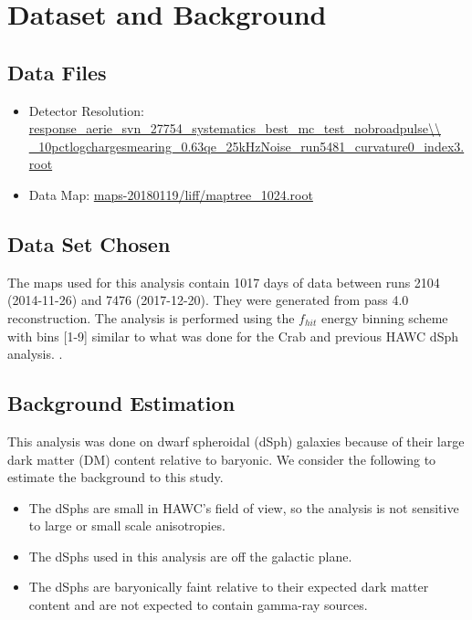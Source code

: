 

\section{Dataset and Background \label{sec:gd_databgd}}

\subsection{Data Files}
\begin{itemize}
    \item Detector Resolution: \url{response\_aerie\_svn\_27754\_systematics\_best\_mc\_test\_nobroadpulse\\
    \_10pctlogchargesmearing\_0.63qe\_25kHzNoise\_run5481\_curvature0\_index3.root}
    \item Data Map: \url{maps-20180119/liff/maptree\_1024.root}
\end{itemize}

\subsection{Data Set Chosen}

The maps used for this analysis contain 1017 days of data between runs 2104 (2014-11-26) and 7476 (2017-12-20). They were generated from pass 4.0 reconstruction.
The analysis is performed using the $f_{hit}$ energy binning scheme with bins [1-9] similar to what was done for the Crab and previous HAWC dSph analysis. \cite{Abeysekara_2017,Albert_2018}.

\subsection{Background Estimation}

This analysis was done on dwarf spheroidal (dSph) galaxies because of their large dark matter (DM) content relative to baryonic.
We consider the following to estimate the background to this study.

\begin{itemize}
    \item The dSphs are small in HAWC's field of view, so the analysis is not sensitive to large or small scale anisotropies.
    \item The dSphs used in this analysis are off the galactic plane.
    \item The dSphs are baryonically faint relative to their expected dark matter content and are not expected to contain gamma-ray sources.
\end{itemize}

